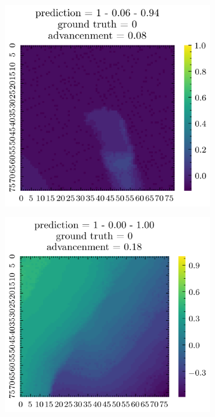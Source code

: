 \begin{figure}[H]
\begin{subfigure}[b]{0.19\textwidth}
    \end{subfigure}  
    \begin{subfigure}[b]{0.19\textwidth}
        \includegraphics[width=\linewidth]{../img/5/quarry/false_negative/patch-2d-2.png}
    \end{subfigure}
    \begin{subfigure}[b]{0.19\textwidth}
        \includegraphics[width=\linewidth]{../img/5/quarry/false_negative/patch-2d-3.png}

\end{subfigure}
\end{figure}
